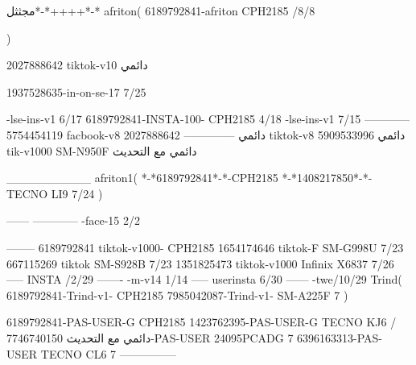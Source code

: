 مجثثل*-*++++*-*
afriton(
6189792841-afriton CPH2185  /8/8

)

2027888642 tiktok-v10
دائمي

1937528635-in-on-se-17 7/25

-lse-ins-v1 6/17
6189792841-INSTA-100- CPH2185 4/18
-lse-ins-v1 7/15
------------
5754454119 facbook-v8
دائمي
--------------
2027888642 tiktok-v8
دائمي
5909533996 tik-v1000  SM-N950F
دائمي مع التحديث

__________
afriton1(
*-*6189792841*-*-CPH2185
*-*1408217850*-*-   TECNO LI9  7/24
)


------
------------
-face-15 2/2

--------
6189792841 tiktok-v1000- CPH2185 
1654174646 tiktok-F SM-G998U  7/23
667115269 tiktok SM-S928B  7/23
1351825473 tiktok-v1000 Infinix X6837  7/26
-----
 INSTA /2/29
-------
-m-v14 1/14
-----
userinsta 6/30
------
-twe/10/29
Trind(
6189792841-Trind-v1- CPH2185 
7985042087-Trind-v1- SM-A225F 7
)


6189792841-PAS-USER-G CPH2185 
1423762395-PAS-USER-G TECNO KJ6  /دائمي مع التحديث
7746740150-PAS-USER 24095PCADG 7
6396163313-PAS-USER TECNO CL6 7
    ---------------
